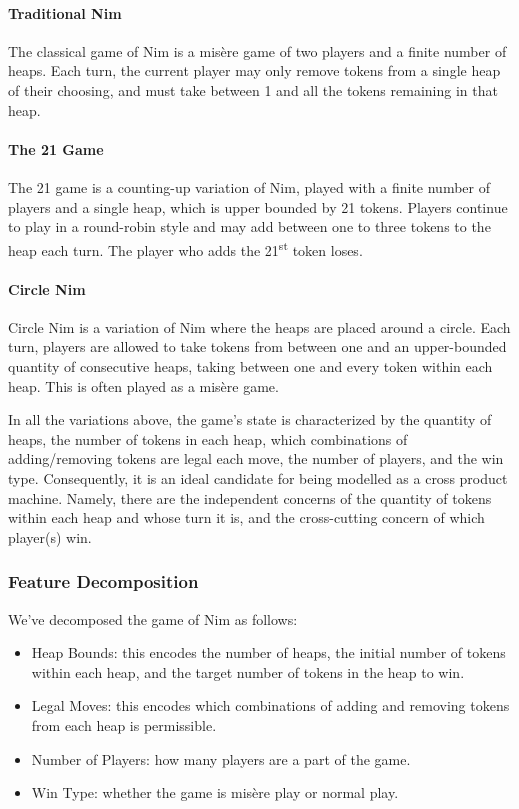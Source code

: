 \documentclass[sigplan,anonymous,review]{acmart}
\begin{document}
\paragraph{Traditional Nim}
The classical game of Nim is a mis\`{e}re game of two players and a finite number of heaps. Each turn, the current player may only remove tokens from a single heap of their choosing, and must take between 1 and all the tokens remaining in that heap. 

\paragraph{The 21 Game}
The 21 game is a counting-up variation of Nim, played with a finite number of players and a single heap, which is upper bounded by 21 tokens. Players continue to play in a round-robin style and may add between one to three tokens to the heap each turn. The player who adds the 21\textsuperscript{st} token loses. 

\paragraph{Circle Nim}
Circle Nim is a variation of Nim where the heaps are placed around a circle. Each turn, players are allowed to take tokens from between one and an upper-bounded quantity of consecutive heaps, taking between one and every token within each heap. This is often played as a mis\`{e}re game. 

In all the variations above, the game's state is characterized by the quantity of heaps, the number of tokens in each heap, which combinations of adding/removing tokens are legal each move, the number of players, and the win type. Consequently, it is an ideal candidate for being modelled as a cross product machine. Namely, there are the independent concerns of the quantity of tokens within each heap and whose turn it is, and the cross-cutting concern of which player(s) win.

\subsubsection{Feature Decomposition}\label{sec:nim:features}

We've decomposed the game of Nim as follows:
\begin{itemize}
    \item Heap Bounds: this encodes the number of heaps, the initial number of tokens within each heap, and the target number of tokens in the heap to win. 
    \item Legal Moves: this encodes which combinations of adding and removing tokens from each heap is permissible.
    \item Number of Players: how many players are a part of the game.
    \item Win Type: whether the game is mis\`{e}re play or normal play. 
\end{itemize}
\end{document}
